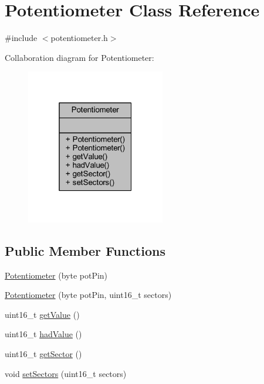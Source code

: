 \hypertarget{class_potentiometer}{}\section{Potentiometer Class Reference}
\label{class_potentiometer}


{\ttfamily \#include $<$potentiometer.\+h$>$}



Collaboration diagram for Potentiometer\+:\nopagebreak
\begin{figure}[H]
\begin{center}
\leavevmode
\includegraphics[width=172pt]{class_potentiometer__coll__graph}
\end{center}
\end{figure}
\subsection*{Public Member Functions}
\begin{DoxyCompactItemize}
\item 
\hyperlink{class_potentiometer_a15bc5c613ca3c66b54cb816af5935c1b}{Potentiometer} (byte pot\+Pin)
\item 
\hyperlink{class_potentiometer_af91e2477f31efbb3b7ebfedb427007ff}{Potentiometer} (byte pot\+Pin, uint16\+\_\+t sectors)
\item 
uint16\+\_\+t \hyperlink{class_potentiometer_ac992f846228fddede6d86d6ffa1be9b6}{get\+Value} ()
\item 
uint16\+\_\+t \hyperlink{class_potentiometer_ad14725e0c1809d03c7a9f808408ed601}{had\+Value} ()
\item 
uint16\+\_\+t \hyperlink{class_potentiometer_a5dabb56ce200afabd7cdf9cd4d0d3305}{get\+Sector} ()
\item 
void \hyperlink{class_potentiometer_ac7b48ed37eb525ff4f8d21899c0a7053}{set\+Sectors} (uint16\+\_\+t sectors)
\end{DoxyCompactItemize}


